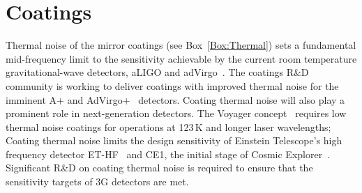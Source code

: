 \chapter{Coatings}
\label{sec:Coatings}




Thermal noise of the mirror coatings (see Box~\ref{Box:Thermal}) sets a fundamental mid-frequency limit to the sensitivity achievable by the current room temperature gravitational-wave detectors, aLIGO and adVirgo~\cite{AdvancedVirgo2015, AdvancedLIGO2015}. The coatings R\&D community is working to deliver coatings with improved thermal noise for the imminent A+ and AdVirgo+~\cite{Zucker:LIGOAplus, Cagnoli:VirgoAplus} detectors. 
Coating thermal noise will also play a prominent role in next-generation detectors. The Voyager concept~\cite{VoyagerDCC2018} requires low thermal noise coatings for operations at 123\,K and longer laser wavelengths; Coating thermal noise limits the design sensitivity of Einstein Telescope's high frequency detector ET-HF~\cite{ET2011} and CE1, the initial stage of Cosmic Explorer~\cite{CosmicExplorer2017}. Significant R\&D on coating thermal noise is required to ensure that the sensitivity targets of 3G detectors are met. 



